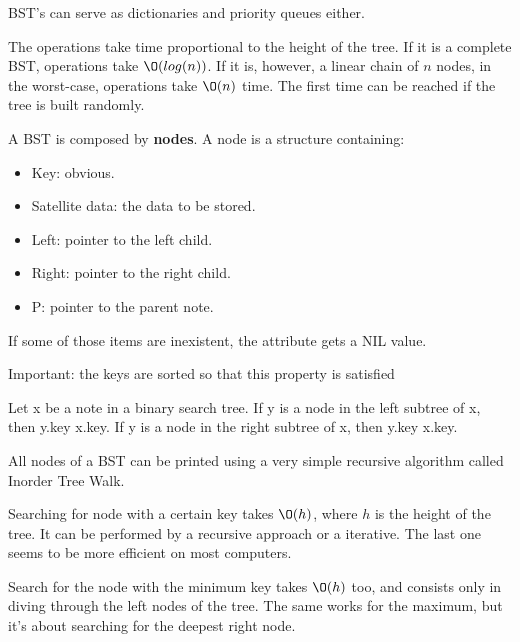 BST's can serve as dictionaries and priority queues either.

The operations take time proportional to the height of the tree. If it is a complete BST, operations take $\O(log (n))$.  If it is, however, a linear chain of $n$ nodes, in the worst-case, operations take $\O(n)$ time. The first time can be reached if the tree is built randomly.

A BST is composed by \textbf{nodes}. A node is a structure containing:
\begin{itemize}
	\item Key: obvious.
	\item Satellite data: the data to be stored.
	\item Left: pointer to the left child.
	\item Right: pointer to the right child.
	\item P: pointer to the parent note.
\end{itemize}

If some of those items are inexistent, the attribute gets a NIL value.

Important: the keys are sorted so that this property is satisfied

Let x be a note in a binary search tree. If y is a node in the left subtree of x,
then y.key \le x.key. If y is a node in the right subtree of x, then
y.key \ge x.key.

All nodes of a BST can be printed using a very simple recursive algorithm called Inorder Tree Walk.

Searching for node with a certain key takes $\O(h)$, where $h$ is the height of the tree. It can be performed by a recursive approach or a iterative. The last one seems to be more
efficient on most computers.

Search for the node with the minimum key takes $\O(h)$ too, and consists only in diving through the left nodes of the tree. The same works for the maximum, but it's about searching for the deepest right node.

